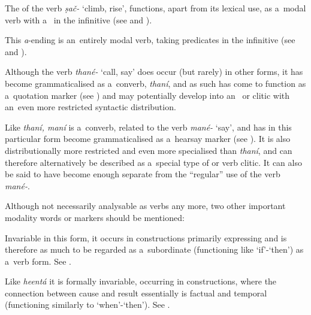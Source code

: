  The  of the verb \textit{ṣač-} `climb, rise', functions, apart from its lexical use, as a~modal verb with a~  in the infinitive (see  and ). 



 This \textit{a}-ending  is an~entirely modal verb, taking  predicates in the infinitive (see  and ).



 Although the verb \textit{thané-} `call, say' does occur (but rarely) in other forms, it has become grammaticalised as a~converb, \textit{thaní}, and as such has come to function as a~quotation marker (see ) and may potentially develop into an~ or clitic with an~even more restricted syntactic distribution.



 Like \textit{thaní, maní} is a~converb, related to the verb \textit{mané-} `say', and has in this particular form become grammaticalised as a~hearsay marker (see ). It is also distributionally more restricted and even more specialised than \textit{thaní}, and can therefore alternatively be described as a~special type of  or verb clitic. It can also be said to have become enough separate from the ``regular'' use of the verb \textit{mané-}.



Although not necessarily analysable as verbs any more, two other important modality words or markers should be mentioned:



 Invariable in this form, it occurs in constructions primarily expressing  and is therefore as much to be regarded as a~subordinate  (functioning like `if'-`then') as a~verb form. See .



 Like \textit{heentá} it is formally invariable, occurring in  constructions, where the connection between cause and result essentially is factual and temporal (functioning similarly to `when'-`then'). See .


